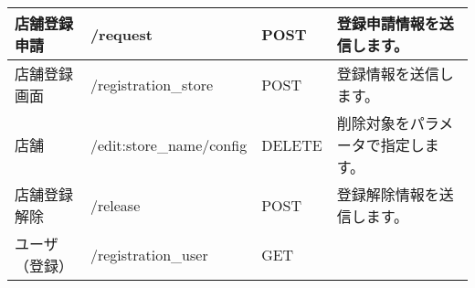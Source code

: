 \documentclass[a4j,titlepage]{jarticle}
\begin{document}
\begin{table}[!htbp]
\begin{center}
\begin{tabular}{|l|l|l|p{5cm}|}
店舗登録申請 & /request & POST & 登録申請情報を送信します。\\\hline
店舗登録画面 & /registration\_store & POST & 登録情報を送信します。\\\hline
店舗 & /edit:store\_name/config & DELETE & 削除対象をパラメータで指定します。\\\hline
店舗登録解除 & /release & POST & 登録解除情報を送信します。\\\hline
ユーザ（登録） & /registration\_user & GET & \\\hline
\end{tabular}
\end{center}
\end{table}
\end{document}
